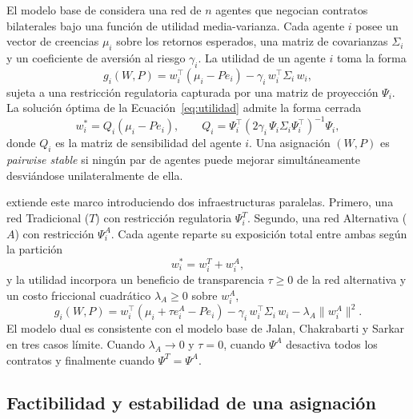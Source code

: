 El modelo base de  considera una red de $n$ agentes que negocian contratos bilaterales bajo una función de utilidad media-varianza. Cada agente $i$ posee un vector de creencias $\mu_i$ sobre los retornos esperados, una matriz de covarianzas $\Sigma_i$ y un coeficiente de aversión al riesgo $\gamma_i$. La utilidad de un agente $i$ toma la forma
\begin{equation}
\label{eq:utilidad}
    g_i(W, P) = w_i^\top (\mu_i - P e_i) - \gamma_i\, w_i^\top \Sigma_i\, w_i,
\end{equation}
sujeta a una restricción regulatoria capturada por una matriz de proyección $\Psi_i$. La solución óptima de la Ecuación~\eqref{eq:utilidad} admite la forma cerrada
\begin{equation}
\label{eq:optimo}
    w_i^* = Q_i(\mu_i - P e_i),
    \qquad
    Q_i = \Psi_i^\top \left( 2\gamma_i\, \Psi_i \Sigma_i \Psi_i^\top \right)^{-1} \Psi_i ,
\end{equation}
donde $Q_i$ es la matriz de sensibilidad del agente $i$. Una asignación $(W,P)$ es \textit{pairwise stable} si ningún par de agentes puede mejorar simultáneamente desviándose unilateralmente de ella.

 extiende este marco introduciendo dos infraestructuras paralelas. Primero, una red Tradicional ($T$) con restricción regulatoria $\Psi_i^T$. Segundo, una red Alternativa ($A$) con restricción $\Psi_i^A$. Cada agente reparte su exposición total entre ambas según la partición
\begin{equation}
\label{eq:particion}
    w_i^* = w_i^T + w_i^A ,
\end{equation}
y la utilidad incorpora un beneficio de transparencia $\tau \geq 0$ de la red alternativa y un costo friccional cuadrático $\lambda_A \geq 0$ sobre $w_i^A$,
\begin{equation}
\label{eq:utilidad-dual}
    g_i(W, P) = w_i^\top (\mu_i + \tau e^A_i - P e_i) - \gamma_i\, w_i^\top \Sigma_i\, w_i
    - \lambda_A \|w^A_i\|^2 .
\end{equation}
El modelo dual es consistente con el modelo base de Jalan, Chakrabarti y Sarkar en tres casos límite. Cuando $\lambda_A \to 0$ y $\tau = 0$, cuando $\Psi^A$ desactiva todos los contratos y finalmente cuando $\Psi^T = \Psi^A$.

\subsection{Factibilidad y estabilidad de una asignación}
\label{c24:estabilidad}

